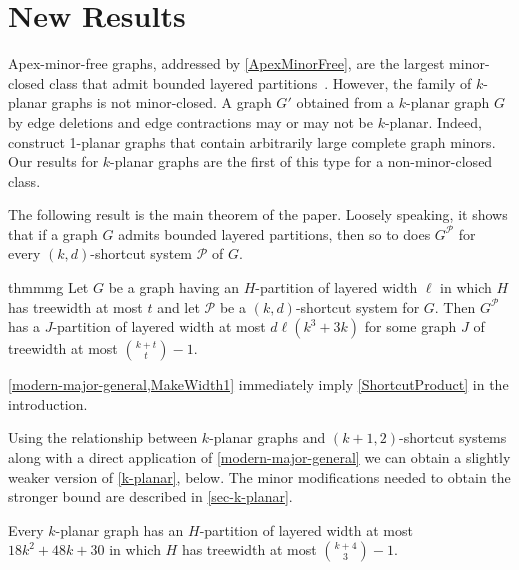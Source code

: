 \documentclass{patmorin}
\newcommand{\notex}[2]{}
\newcommand{\PP}{\mathcal{P}}
\newcommand{\treewidth}{\ensuremath{\binom{k+4}{3}}-1}
\begin{document}
\section{New Results}

Apex-minor-free graphs, addressed by \cref{ApexMinorFree}, are the largest minor-closed class that admit bounded layered partitions~\citep{dujmovic.joret.ea:planar}. However, the family of $k$-planar graphs is not minor-closed.  A graph $G'$ obtained from a $k$-planar graph $G$ by edge deletions and edge contractions may or may not be $k$-planar. Indeed, \citet{dujmovic.eppstein.ea:structure} construct 1-planar graphs that contain arbitrarily large complete graph minors. Our results for $k$-planar graphs are the first of this type for a non-minor-closed class. 

The following result is the main theorem of the paper. Loosely speaking, it shows that if a graph $G$ admits bounded layered partitions, then so to does $G^\PP$ for every $(k,d)$-shortcut system $\PP$ of $G$. 

\begin{restatable}{thm}{mmg}
  \label{modern-major-general}
    Let $G$ be a graph having an $H$-partition of layered width $\ell$ in which $H$ has treewidth at most $t$ and let $\PP$ be a $(k,d)$-shortcut system for $G$.  Then $G^\PP$ has a $J$-partition of layered width at most $d\ell(k^3+3k)$ for some graph $J$ of treewidth at most $\binom{k+t}{t}-1$.
\end{restatable}

\cref{modern-major-general,MakeWidth1} immediately imply \cref{ShortcutProduct} in the introduction. 

Using the relationship between $k$-planar graphs and $(k+1,2)$-shortcut systems along with a direct application of \cref{modern-major-general} we can obtain a slightly weaker version of \cref{k-planar}, below. The minor modifications needed to obtain the stronger bound are described in \cref{sec-k-planar}. 

\begin{thm}
\label{k-planar}
Every $k$-planar graph has an $H$-partition of layered width at most $18k^2 + 48k+30$ in which $H$ has treewidth at most $\binom{k+4}{3}-1$. %
\end{thm}

\end{document}
